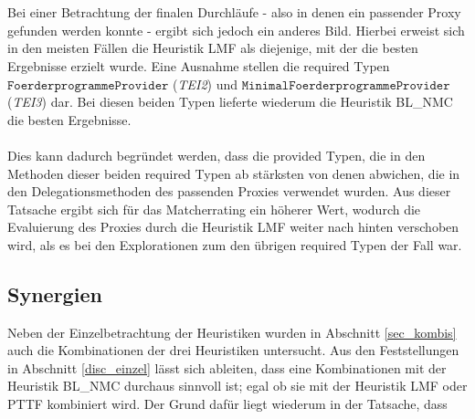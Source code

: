 \\\\
Bei einer Betrachtung der finalen Durchläufe - also in denen ein passender Proxy gefunden werden konnte - ergibt sich jedoch ein anderes Bild. Hierbei erweist sich in den meisten Fällen die Heuristik LMF als diejenige, mit der die besten Ergebnisse erzielt wurde. Eine Ausnahme stellen die required Typen $\texttt{FoerderprogrammeProvider}$ (\emph{TEI2}) und $\texttt{MinimalFoerderprogrammeProvider}$ (\emph{TEI3}) dar. Bei diesen beiden Typen lieferte wiederum die Heuristik BL\_NMC die besten Ergebnisse.
\\\\
Dies kann dadurch begründet werden, dass die provided Typen, die in den Methoden dieser beiden required Typen ab stärksten von denen abwichen, die in den Delegationsmethoden des passenden Proxies verwendet wurden. Aus dieser Tatsache ergibt sich für das Matcherrating ein höherer Wert, wodurch die Evaluierung des Proxies durch die Heuristik LMF weiter nach hinten verschoben wird, als es bei den Explorationen zum den übrigen required Typen der Fall war.
\subsection{Synergien}
Neben der Einzelbetrachtung der Heuristiken wurden in Abschnitt \ref{sec_kombis} auch die Kombinationen der drei Heuristiken untersucht. Aus den Feststellungen in Abschnitt \ref{disc_einzel} lässt sich ableiten, dass eine Kombinationen mit der Heuristik BL\_NMC durchaus sinnvoll ist; egal ob sie mit der Heuristik LMF oder PTTF kombiniert wird. Der Grund dafür liegt wiederum in der Tatsache, dass 
